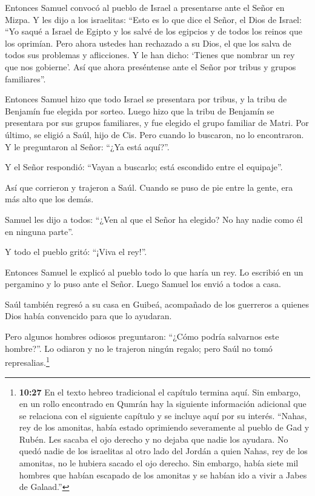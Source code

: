  Entonces Samuel convocó al pueblo de Israel a presentarse
ante el Señor en Mizpa.  Y les dijo a los israelitas:
``Esto es lo que dice el Señor, el Dios de Israel: ``Yo saqué a Israel
de Egipto y los salvé de los egipcios y de todos los reinos que los
oprimían.  Pero ahora ustedes han rechazado a su Dios, el
que los salva de todos sus problemas y aflicciones. Y le han dicho:
`Tienes que nombrar un rey que nos gobierne'. Así que ahora preséntense
ante el Señor por tribus y grupos familiares''.

 Entonces Samuel hizo que todo Israel se presentara por
tribus, y la tribu de Benjamín fue elegida por sorteo. 
Luego hizo que la tribu de Benjamín se presentara por sus grupos
familiares, y fue elegido el grupo familiar de Matri. Por último, se
eligió a Saúl, hijo de Cis. Pero cuando lo buscaron, no lo encontraron.
 Y le preguntaron al Señor: ``¿Ya está aquí?''.

Y el Señor respondió: ``Vayan a buscarlo; está escondido entre el
equipaje''.

 Así que corrieron y trajeron a Saúl. Cuando se puso de pie
entre la gente, era más alto que los demás.

 Samuel les dijo a todos: ``¿Ven al que el Señor ha
elegido? No hay nadie como él en ninguna parte''.

Y todo el pueblo gritó: ``¡Viva el rey!''.

 Entonces Samuel le explicó al pueblo todo lo que haría un
rey. Lo escribió en un pergamino y lo puso ante el Señor. Luego Samuel
los envió a todos a casa.

 Saúl también regresó a su casa en Guibeá, acompañado de
los guerreros a quienes Dios había convencido para que lo ayudaran.

 Pero algunos hombres odiosos preguntaron: ``¿Cómo podría
salvarnos este hombre?''. Lo odiaron y no le trajeron ningún regalo;
pero Saúl no tomó represalias.\footnote{\textbf{10:27} En el texto
  hebreo tradicional el capítulo termina aquí. Sin embargo, en un rollo
  encontrado en Qumrán hay la siguiente información adicional que se
  relaciona con el siguiente capítulo y se incluye aquí por su interés.
  ``Nahas, rey de los amonitas, había estado oprimiendo severamente al
  pueblo de Gad y Rubén. Les sacaba el ojo derecho y no dejaba que nadie
  los ayudara. No quedó nadie de los israelitas al otro lado del Jordán
  a quien Nahas, rey de los amonitas, no le hubiera sacado el ojo
  derecho. Sin embargo, había siete mil hombres que habían escapado de
  los amonitas y se habían ido a vivir a Jabes de Galaad.''}

